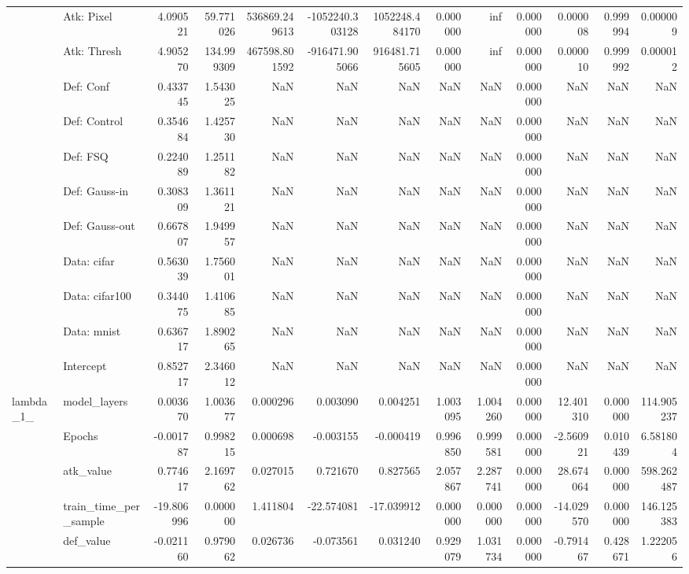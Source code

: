\begin{table}[htbp]
\begin{tabular}{llrrrrrrrrrrr}
 & Atk: Pixel & 4.090521 & 59.771026 & 536869.249613 & -1052240.303128 & 1052248.484170 & 0.000000 & inf & 0.000000 & 0.000008 & 0.999994 & 0.000009 \\
 & Atk: Thresh & 4.905270 & 134.999309 & 467598.801592 & -916471.905066 & 916481.715605 & 0.000000 & inf & 0.000000 & 0.000010 & 0.999992 & 0.000012 \\
 & Def: Conf & 0.433745 & 1.543025 & NaN & NaN & NaN & NaN & NaN & 0.000000 & NaN & NaN & NaN \\
 & Def: Control & 0.354684 & 1.425730 & NaN & NaN & NaN & NaN & NaN & 0.000000 & NaN & NaN & NaN \\
 & Def: FSQ & 0.224089 & 1.251182 & NaN & NaN & NaN & NaN & NaN & 0.000000 & NaN & NaN & NaN \\
 & Def: Gauss-in & 0.308309 & 1.361121 & NaN & NaN & NaN & NaN & NaN & 0.000000 & NaN & NaN & NaN \\
 & Def: Gauss-out & 0.667807 & 1.949957 & NaN & NaN & NaN & NaN & NaN & 0.000000 & NaN & NaN & NaN \\
 & Data: cifar & 0.563039 & 1.756001 & NaN & NaN & NaN & NaN & NaN & 0.000000 & NaN & NaN & NaN \\
 & Data: cifar100 & 0.344075 & 1.410685 & NaN & NaN & NaN & NaN & NaN & 0.000000 & NaN & NaN & NaN \\
 & Data: mnist & 0.636717 & 1.890265 & NaN & NaN & NaN & NaN & NaN & 0.000000 & NaN & NaN & NaN \\
 & Intercept & 0.852717 & 2.346012 & NaN & NaN & NaN & NaN & NaN & 0.000000 & NaN & NaN & NaN \\
\cline{1-13}
\multirow[t]{23}{*}{lambda\_1\_} & model\_layers & 0.003670 & 1.003677 & 0.000296 & 0.003090 & 0.004251 & 1.003095 & 1.004260 & 0.000000 & 12.401310 & 0.000000 & 114.905237 \\
 & Epochs & -0.001787 & 0.998215 & 0.000698 & -0.003155 & -0.000419 & 0.996850 & 0.999581 & 0.000000 & -2.560921 & 0.010439 & 6.581804 \\
 & atk\_value & 0.774617 & 2.169762 & 0.027015 & 0.721670 & 0.827565 & 2.057867 & 2.287741 & 0.000000 & 28.674064 & 0.000000 & 598.262487 \\
 & train\_time\_per\_sample & -19.806996 & 0.000000 & 1.411804 & -22.574081 & -17.039912 & 0.000000 & 0.000000 & 0.000000 & -14.029570 & 0.000000 & 146.125383 \\
 & def\_value & -0.021160 & 0.979062 & 0.026736 & -0.073561 & 0.031240 & 0.929079 & 1.031734 & 0.000000 & -0.791467 & 0.428671 & 1.222056 \\

\end{tabular}
\end{table}
